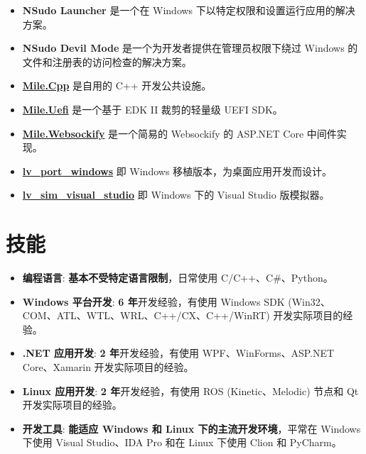 \documentclass{resume}
\begin{document}
\begin{itemize}
  \item \textbf{NSudo Launcher} 是一个在 Windows 下以特定权限和设置运行应用的解决方案。
  \item \textbf{NSudo Devil Mode} 是一个为开发者提供在管理员权限下绕过 Windows 的文件和注册表的访问检查的解决方案。
\end{itemize}

\begin{itemize}
  \item \href{https://github.com/ProjectMile/Mile.Cpp}{\textbf{Mile.Cpp}} 是自用的 C++ 开发公共设施。
  \item \href{https://github.com/ProjectMile/Mile.Uefi}{\textbf{Mile.Uefi}} 是一个基于 EDK II 裁剪的轻量级 UEFI SDK。
  \item \href{https://github.com/ProjectMile/Mile.Websockify}{\textbf{Mile.Websockify}} 是一个简易的 Websockify 的 ASP.NET Core 中间件实现。
\end{itemize}

\begin{itemize}
  \item \href{https://github.com/lvgl/lv_port_windows}{\textbf{lv\_port\_windows}} 即 Windows 移植版本，为桌面应用开发而设计。
  \item \href{https://github.com/lvgl/lv_sim_visual_studio}{\textbf{lv\_sim\_visual\_studio}} 即 Windows 下的 Visual Studio 版模拟器。
\end{itemize}

\section{技能}
\begin{itemize}

  \item \textbf{编程语言}:
    \textbf{基本不受特定语言限制}，日常使用 C/C++、C\#、Python。

  \item \textbf{Windows 平台开发}:
    \textbf{6 年}开发经验，有使用 Windows SDK (Win32、COM、ATL、WTL、WRL、C++/CX、C++/WinRT) 开发实际项目的经验。

  \item \textbf{.NET 应用开发}:
    \textbf{2 年}开发经验，有使用 WPF、WinForms、ASP.NET Core、Xamarin 开发实际项目的经验。
  
  \item \textbf{Linux 应用开发}:
    \textbf{2 年}开发经验，有使用 ROS (Kinetic、Melodic) 节点和 Qt 开发实际项目的经验。

  \item \textbf{开发工具}:
    \textbf{能适应 Windows 和 Linux 下的主流开发环境}，平常在 Windows 下使用 Visual Studio、IDA Pro 和在 Linux 下使用 Clion 和 PyCharm。

\end{itemize}
\end{document}
